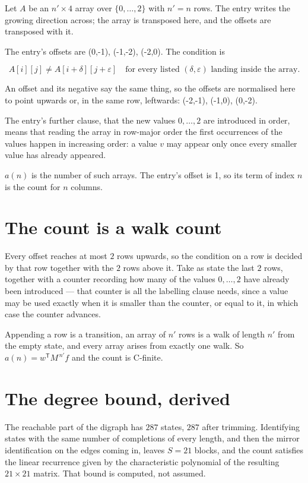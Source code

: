 \documentclass[11pt]{article}
\theoremstyle{definition}
\begin{document}
Let $A$ be an $n' \times 4$ array over $\{0,\dots,2\}$ with $n' = n$ rows. The entry writes the growing direction across; the array is transposed here, and the offsets are transposed with it.

The entry's offsets are (0,-1), (-1,-2), (-2,0). The condition is

\[A[i][j] \ne A[i{+}\delta][j{+}\varepsilon]\quad\text{for every listed }(\delta,\varepsilon)\text{ landing inside the array.}\]

An offset and its negative say the same thing, so the offsets are normalised here to point upwards or, in the same row, leftwards: (-2,-1), (-1,0), (0,-2).

The entry's further clause, that the new values $0,\dots,2$ are introduced in order, means that reading the array in row-major order the first occurrences of the values happen in increasing order: a value $v$ may appear only once every smaller value has already appeared.

$a(n)$ is the number of such arrays. The entry's offset is 1, so its term of index $n$ is the count for $n$ columns.

\section{The count is a walk count}

Every offset reaches at most $2$ rows upwards, so the condition on a row is decided by that row together with the $2$ rows above it. Take as state the last $2$ rows, together with a counter recording how many of the values $0,\dots,2$ have already been introduced --- that counter is all the labelling clause needs, since a value may be used exactly when it is smaller than the counter, or equal to it, in which case the counter advances.

Appending a row is a transition, an array of $n'$ rows is a walk of length $n'$ from the empty state, and every array arises from exactly one walk. So $a(n) = w^{\mathsf T}M^{\,n'}f$ and the count is C-finite.

\section{The degree bound, derived}

The reachable part of the digraph has $287$ states, $287$ after trimming. Identifying states with the same number of completions of every length, and then the mirror identification on the edges coming in, leaves $S = 21$ blocks, and the count satisfies the linear recurrence given by the characteristic polynomial of the resulting $21\times21$ matrix. That bound is computed, not assumed.
\end{document}

